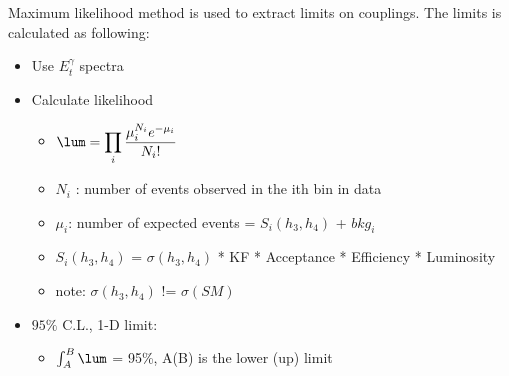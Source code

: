 \documentclass[12pt,twoside,letterpaper]{article}
\begin{document}
Maximum likelihood method is used to extract limits on couplings. The
limits is calculated as following:
	\begin{itemize}
	   \item Use $E_t^{\gamma}$ spectra
	   \item Calculate likelihood \\
	    \begin{itemize}
	    \item $\lum = \displaystyle\prod_i \frac{\mu_i^{N_i}e^{-\mu_i}}{N_i !}$
	       \item $N_i$ : number of events observed in the ith bin in data
	       \item $\mu_i$: number of expected events = $S_i(h_3, h_4)$ + $bkg_i$
	       \item $S_i(h_3, h_4)$  = $\sigma(h_3, h_4)$ * KF * Acceptance * Efficiency * Luminosity  
	       \item note: $\sigma(h_3, h_4)$ != $\sigma(SM)$ 
	    \end{itemize}
	    \item $95\%$ C.L., 1-D limit:
	\begin{itemize}
	   \item $\int_{A}^{B}{\lum}$ = 95\%, A(B) is the lower (up) limit
	\end{itemize}
 	\end{itemize}
\end{document}
